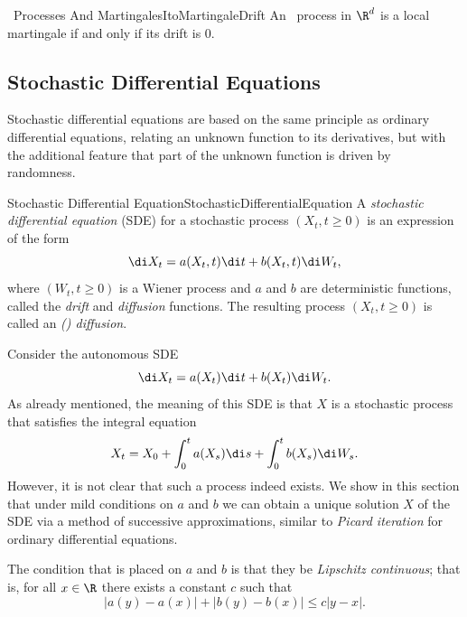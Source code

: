 \begin{thm}{\Ito\ Processes And Martingales}{ItoMartingaleDrift}
	An \Ito\ process in \(\R^d\) is a local martingale if and only if its drift is 0.
\end{thm}

\clearpage
\subsection{Stochastic Differential Equations}\label{sec:StochasticDifferentialEquations}
Stochastic differential equations are based on the same principle as ordinary differential equations, relating an unknown function to its derivatives, but with the additional feature that part of the unknown function is driven by randomness.

\begin{defn}{Stochastic Differential Equation}{StochasticDifferentialEquation}
	A \textit{stochastic differential equation} (SDE) for a stochastic process \((X_t, t \ge 0)\) is an expression of the form
	\begin{equation}
		\di X_t = a(X_t, t) \di t + b(X_t, t) \di W_t,
		\label{eq:StochasticDifferentialEquationForm}
	\end{equation}
	where \((W_t, t \ge 0)\) is a Wiener process and \(a\) and \(b\) are deterministic functions, called the \textit{drift} and \textit{diffusion} functions. The resulting process \((X_t, t \ge 0)\) is called an \textit{(\Ito) diffusion}.
\end{defn}

Consider the autonomous SDE
\begin{equation}
	\di X_t = a(X_t) \di t + b(X_t) \di W_t.
	\label{eq:AutonomousSDE}
\end{equation}
As already mentioned, the meaning of this SDE is that \(X\) is a stochastic process that satisfies the integral equation
\begin{equation}
	X_t = X_0 + \int_0^t a(X_s) \di s + \int_0^t b(X_s) \di W_s.
	\label{eq:StochasticIntegralEquation}
\end{equation}
However, it is not clear that such a process indeed exists. We show in this section that under mild conditions on \(a\) and \(b\) we can obtain a unique solution \(X\) of the SDE via a method of successive approximations, similar to \textit{Picard iteration} for ordinary differential equations.

The condition that is placed on \(a\) and \(b\) is that they be \textit{Lipschitz continuous}; that is, for all \(x \in \R\) there exists a constant \(c\) such that
\begin{equation}
	|a(y) - a(x)| + |b(y) - b(x)| \le c|y - x|.
	\label{eq:LipschitzCondition1D}
\end{equation}

